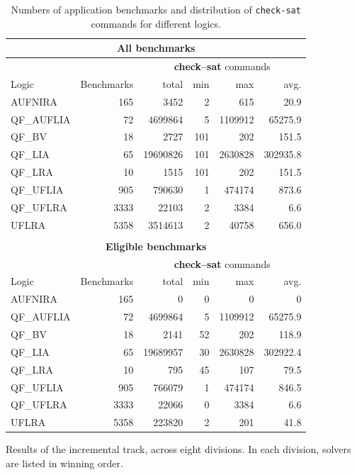 \documentclass[twoside,11pt]{article}
\begin{document}
\begin{table}
\caption{Numbers of application benchmarks and distribution of \lstinline{check-sat} commands for different logics.}
\label{Fig:apptrack-benchmarks}
\centering
\begin{tabular}{|l|r|rrrr|}
\multicolumn{6}{c}{\textbf{All benchmarks}} \\
\hline
&  & \multicolumn{4}{c|}{{\small\bfseries\sffamily check--sat} commands} \\
 Logic & Benchmarks & total & min & max & avg. \\
\hline
AUFNIRA & 165  & 3452 & 2 & 615 & 20.9 \\
QF\_AUFLIA & 72 & 4699864 & 5 & 1109912 & 65275.9 \\
QF\_BV & 18 & 2727 & 101 & 202 & 151.5 \\
QF\_LIA & 65 & 19690826 & 101 & 2630828 & 302935.8 \\
QF\_LRA & 10 & 1515 & 101 & 202 & 151.5 \\
QF\_UFLIA & 905 & 790630 & 1 & 474174 & 873.6 \\
QF\_UFLRA & 3333 & 22103 & 2 & 3384 & 6.6 \\
UFLRA & 5358 & 3514613 & 2 & 40758 & 656.0 \\
\hline
\multicolumn{6}{c}{}\\
\multicolumn{6}{c}{\textbf{Eligible benchmarks}} \\
\hline
&  & \multicolumn{4}{c|}{{\small\bfseries\sffamily check--sat} commands} \\
 Logic & Benchmarks & total & min & max & avg. \\
\hline
AUFNIRA & 165  & 0 & 0 & 0 & 0 \\
QF\_AUFLIA & 72 & 4699864 & 5 & 1109912 & 65275.9 \\
QF\_BV & 18 & 2141 & 52 & 202 & 118.9 \\
QF\_LIA & 65 & 19689957 & 30 & 2630828 & 302922.4 \\
QF\_LRA & 10 & 795 & 45 & 107 & 79.5 \\
QF\_UFLIA & 905 & 766079 & 1 & 474174 & 846.5 \\
QF\_UFLRA & 3333 & 22066 & 0 & 3384 & 6.6 \\
UFLRA & 5358 & 223820 & 2 & 201 & 41.8 \\
\hline
\end{tabular}
\end{table}

\begin{table}
\caption{Results of the incremental track, across eight divisions. In each division, solvers are listed in winning order.}
\label{Fig:apptrack-results}
\vspace{-\medskipamount}
\centering
\resizebox{!}{294pt}{}
\end{table}
\end{document}
